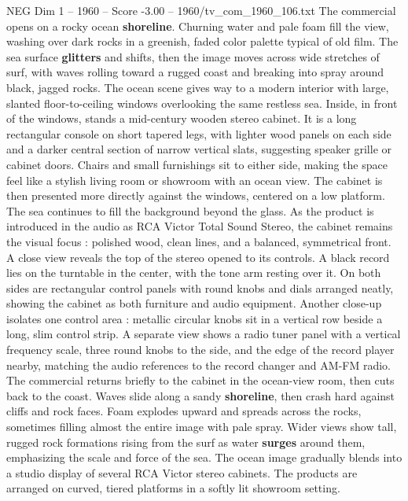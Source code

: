\begin{textsample}{NEG Dim 1 – 1960 – Score -3.00 – 1960/tv\_com\_1960\_106.txt}  \label{ex:f1_neg_026}
The commercial opens on a rocky ocean \textbf{shoreline}.
Churning water and pale foam fill the view, washing over dark rocks in a greenish, faded color palette typical of old film.
The sea surface \textbf{glitters} and shifts, then the image moves across wide stretches of surf, with waves rolling toward a rugged coast and breaking into spray around black, jagged rocks.
The ocean scene gives way to a modern interior with large, slanted floor-to-ceiling windows overlooking the same restless sea.
Inside, in front of the windows, stands a mid-century wooden stereo cabinet.
It is a long rectangular console on short tapered legs, with lighter wood panels on each side and a darker central section of narrow vertical slats, suggesting speaker grille or cabinet doors.
Chairs and small furnishings sit to either side, making the space feel like a stylish living room or showroom with an ocean view.
The cabinet is then presented more directly against the windows, centered on a low platform.
The sea continues to fill the background beyond the glass.
As the product is introduced in the audio as RCA Victor Total Sound Stereo, the cabinet remains the visual focus : polished wood, clean lines, and a balanced, symmetrical front.
A close view reveals the top of the stereo opened to its controls.
A black record lies on the turntable in the center, with the tone arm resting over it.
On both sides are rectangular control panels with round knobs and dials arranged neatly, showing the cabinet as both furniture and audio equipment.
Another close-up isolates one control area : metallic circular knobs sit in a vertical row beside a long, slim control strip.
A separate view shows a radio tuner panel with a vertical frequency scale, three round knobs to the side, and the edge of the record player nearby, matching the audio references to the record changer and AM-FM radio.
The commercial returns briefly to the cabinet in the ocean-view room, then cuts back to the coast.
Waves slide along a sandy \textbf{shoreline}, then crash hard against cliffs and rock faces.
Foam explodes upward and spreads across the rocks, sometimes filling almost the entire image with pale spray.
Wider views show tall, rugged rock formations rising from the surf as water \textbf{surges} around them, emphasizing the scale and force of the sea.
The ocean image gradually blends into a studio display of several RCA Victor stereo cabinets.
The products are arranged on curved, tiered platforms in a softly lit showroom setting.

\end{textsample}
